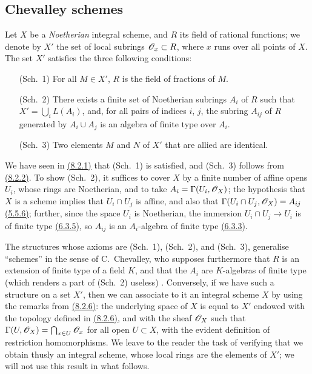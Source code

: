 \subsection{Chevalley schemes}
\label{subsection-chevalley-schemes}

\begin{env}[8.3.1]
\label{env-1.8.3.1}
Let $X$ be a {\em Noetherian} integral scheme, and $R$ its
field of rational functions; we denote by $X'$ the set of local subrings
$\mathscr{O}_x\subset R$, where $x$ runs over all points of $X$. The set $X'$ satisfies
the three following conditions:
\begin{itemize}
  \item[(Sch.~1)] For all $M\in X'$, $R$ is the field of fractions of $M$.
  \item[(Sch.~2)] There exists a finite set of Noetherian subrings $A_i$ of $R$
    such that $X'=\bigcup_i L(A_i)$, and, for all pairs of indices $i$, $j$, the subring
    $A_{ij}$ of $R$ generated by $A_i\cup A_j$ is an algebra of finite type over $A_i$.
  \item[(Sch.~3)] Two elements $M$ and $N$ of $X'$ that are allied are identical.
\end{itemize}
\end{env}

We have seen in \hyperref[env-1.8.2.1]{(8.2.1)} that (Sch.~1) is satisfied, and (Sch.~3)
follows from \hyperref[env-1.8.2.2]{(8.2.2)}. To show (Sch.~2), it suffices to cover $X$ by a
finite number of affine opens $U_i$, whose rings are Noetherian, and to take
$A_i=\Gamma(U_i,\mathscr{O}_X)$; the hypothesis that $X$ is a scheme implies that
$U_i\cap U_j$ is affine, and also that $\Gamma(U_i\cap U_j,\mathscr{O}_X)=A_{ij}$
\hyperref[env-1.5.5.6]{(5.5.6)}; further, since the space $U_i$ is Noetherian, the immersion
$U_i\cap U_j\to U_i$ is of finite type \hyperref[env-1.6.3.5]{(6.3.5)}, so $A_{ij}$ is an
$A_i$-algebra of finite type \hyperref[env-1.6.3.3]{(6.3.3)}.

\begin{env}[8.3.2]
\label{env-1.8.3.2}
The structures whose axioms are (Sch.~1), (Sch.~2), and
(Sch.~3), generalise ``schemes'' in the sense of C.~Chevalley, who supposes
furthermore that $R$ is an extension of finite type of a field $K$, and that the
$A_i$ are $K$-algebras of finite type (which renders a part of (Sch.~2) useless)
\cite{I-1}. Conversely, if we have such a structure on a set $X'$, then we can
associate to it an integral scheme $X$ by using the remarks from \hyperref[env-1.8.2.6]{(8.2.6)}:
the underlying space of $X$ is equal to $X'$ endowed with the topology defined
in \hyperref[env-1.8.2.6]{(8.2.6)}, and with the sheaf $\mathscr{O}_X$ such that
$\Gamma(U,\mathscr{O}_X)=\bigcap_{x\in U}\mathscr{O}_x$ for all open $U\subset X$, with the
evident definition of restriction homomorphisms. We leave to the reader the
task of verifying that we obtain thusly an integral scheme, whose local rings
are the elements of $X'$; we will not use this result in what follows.
\end{env}

